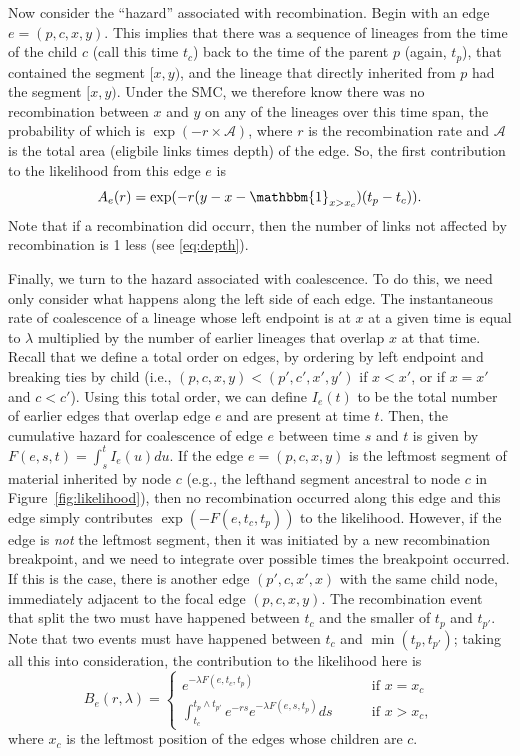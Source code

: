 \documentclass{article}
\begin{document}
Now consider the ``hazard'' associated with recombination.
Begin with an edge $e = (p,c,x,y)$.
This implies that there was a sequence of lineages
from the time of the child $c$ (call this time $t_c$)
back to the time of the parent $p$ (again, $t_p$),
that contained the segment $[x,y)$,
and the lineage that directly inherited from $p$
had the segment $[x,y)$.
Under the SMC,
we therefore know there was no recombination between $x$ and $y$
on any of the lineages 
over this time span,
the probability of which is
$\exp(-r \times \mathcal{A})$, where $r$ is the recombination rate
and $\mathcal{A}$ is the total area (eligbile links times depth) of the edge.
So, the first contribution to the likelihood from this edge $e$ is
\begin{equation}\label{eq:span}
A_e(r) = \exp(-r (y-x - \mathbbm{1}_{x > x_c})(t_p - t_{c})) .
\end{equation}
Note that if a recombination did occurr, then the number of links not
affected by recombination is 1 less (see \ref{eq:depth}).

Finally, we turn to the hazard associated with coalescence.
To do this, we need only consider what happens along the left side
of each edge.
The instantaneous rate of coalescence of a lineage whose left endpoint is at $x$
at a given time is equal to $\lambda$ multiplied
by the number of earlier lineages that overlap $x$ at that time.
Recall that we define a total order on edges,
by ordering by left endpoint and breaking ties by child
(i.e., $(p,c,x,y) < (p',c',x',y')$
if $x<x'$, or if $x=x'$ and $c<c'$).
Using this total order, we can define
$I_e(t)$ to be the total number of earlier edges that overlap edge $e$
and are present at time $t$.
Then, the cumulative hazard for coalescence of edge $e$
between time $s$ and $t$ is given by $F(e, s, t) = \int_{s}^{t} I_{e}(u) du$.
If the edge $e = (p,c,x,y)$
is the leftmost segment of material inherited by node $c$
(e.g., the lefthand segment ancestral to node $c$
in Figure~\ref{fig:likelihood}),
then no recombination occurred along this edge and 
this edge simply contributes $\exp(-F(e,t_c,t_p))$ to the likelihood.
However, if the edge is \emph{not} the leftmost segment,
then it was initiated by a new recombination breakpoint,
and we need to integrate over possible times the breakpoint occurred.
If this is the case, there is another edge $(p',c,x',x)$ with the same child node,
immediately adjacent to the focal edge $(p,c,x,y)$.
The recombination event that split the two must have happened between $t_c$
and the smaller of $t_p$ and $t_{p'}$. Note that two events must have happened
between $t_c$ and $\min(t_p, t_{p'})$; taking all this into consideration,
the contribution to the likelihood here is
\begin{equation}\label{eq:depth}
B_e(r, \lambda) = \begin{cases}
    e^{-\lambda F(e, t_c, t_p)}
        & \qquad \text{if } x=x_{c} \\
    \int_{t_c}^{t_{p} \wedge t_{p'}} e^{- r s} e^{-\lambda F(e, s, t_{p})} ds
        & \qquad \text{if } x>x_{c} ,
\end{cases}
\end{equation}
where $x_c$ is the leftmost position of the edges whose children are $c$.
\end{document}
